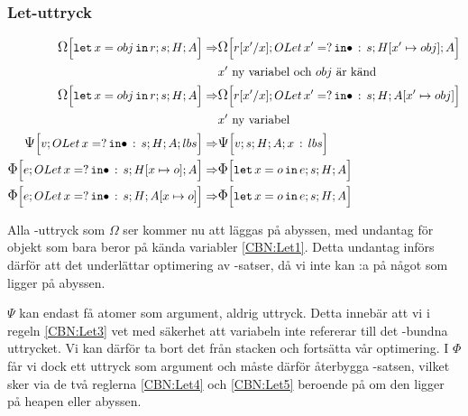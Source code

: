 \documentclass[../Optimise]{subfiles}
\begin{document}
\subsubsection{Let-uttryck}
\begin{align}
\label{CBN:Let1} \CBNOMEGA sHA{\eLet x{obj}r} \Rightarrow & \CBNOMEGA {\cOLet{x'}s}{\heap{x'}{obj}}A{\subst r{x'}x}\\
   & x'\mbox{ ny variabel och } obj \text{ är känd}\nonumber \\
\label{CBN:Let2} \CBNOMEGA sHA{\eLet x{obj}r} \Rightarrow & \CBNOMEGA{\cOLet{x'}s}H{\abyss{x'}{obj}}{\subst r{x'}x}\\
   & x'\mbox{ ny variabel} \nonumber \\
\label{CBN:Let3} \CBNPSI{\cOLet xs}H A{lbs}v \Rightarrow & \CBNPSI sHA{x\,:\, lbs}v \\
\label{CBN:Let4} \CBNIRR{\cOLet xs}{\heap xo}Ae \Rightarrow & \CBNIRR sHA{\eLet xoe} \\
\label{CBN:Let5} \CBNIRR{\cOLet xs}H{\abyss xo}e \Rightarrow & \CBNIRR sHA{\eLet xoe}
\end{align}



Alla -uttryck som $\Omega$ ser kommer nu att läggas på abyssen, 
med undantag för objekt som bara beror på kända variabler \eqref{CBN:Let1}. 
Detta undantag införs därför att det underlättar optimering av -satser, 
då vi inte kan :a på något som ligger på abyssen.

$\Psi$ kan endast få atomer som argument, aldrig uttryck. Detta innebär att vi 
i regeln \eqref{CBN:Let3} vet med säkerhet att variabeln inte refererar till det 
-bundna uttrycket. Vi kan därför ta bort det från stacken och fortsätta 
vår optimering. I $\Phi$ får vi dock ett uttryck som argument och måste därför 
återbygga -satsen, vilket sker via de två reglerna \eqref{CBN:Let4} och 
\eqref{CBN:Let5} beroende på om den ligger på heapen eller abyssen.
\end{document}
